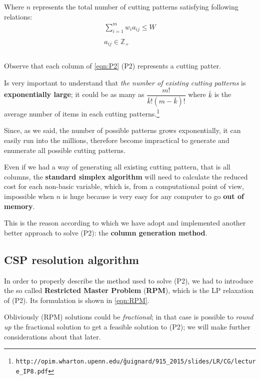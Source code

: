 \documentclass[10pt,a4paper]{article}
\begin{document}
Where $n$ represents the total number of cutting patterns satisfying following relations:
\begin{equation}
\begin{array} {c} 
\displaystyle\sum_{i=1}^m w_i a_{ij} \leq W \\\\ a_{ij} \in \mathbb{Z}_{+}\\\\
\end{array}
\end{equation}

Observe that each column of \ref{eqn:P2} (P2) represents a cutting patter. 

Is very important to understand that \textit{the number of existing cutting patterns} is \textbf{exponentially large}; it could be as many as $\dfrac{m!}{\bar{k}!(m-\bar{k})!}$ where $\bar{k}$ is the average number of items in each cutting patterns.\footnote{\texttt{http://opim.wharton.upenn.edu/\~guignard/915\_2015/slides/LR/CG/lecture\_IP8.pdf}}

Since, as we said, the number of possible patterns grows exponentially, it can easily run into the millions, therefore become impractical to generate and enumerate all possible cutting patterns. 

Even if we had a way of generating all existing cutting pattern, that is all columns, the \textbf{standard simplex algorithm} will need to calculate the reduced cost for each non-basic variable, which is, from a computational point of view, impossible when $n$ is huge because is very easy for any computer to go \textbf{out of memory}.

This is the reason according to which we have adopt and implemented another better approach to solve (P2): the \textbf{column generation method}.

\newpage
\subsection{CSP resolution algorithm}

In order to properly describe the method used to solve (P2), we had to introduce the so called \textbf{Restricted Master Problem} (\textbf{RPM}), which is the LP relaxation of (P2). Its formulation is shown in \ref{eqn:RPM}.

Obliviously (RPM) solutions could be \textit{fractional}; in that case is possible to \textit{round up} the fractional solution to get a feasible solution to (P2); we will make further considerations about that later. 
\end{document}

